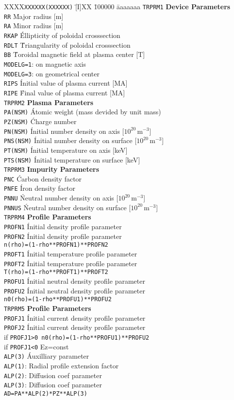 \documentclass[11pt]{jarticle}
\def\r#1{\mathrm{#1}}
\def\unit#1{\,\r{#1}}
\renewcommand{\title}[1]{\begin{center}\fboxsep=3mm\fbox{\textbf{#1}}\end{center}}
\newcommand{\inputParmLine}
{XXXX\= \texttt{XXXXXX(XXXXXX)} \= [I]XX \= 100000 \= aaaaaaa\kill}
\newcommand{\inputParmBlock}[2]
{\texttt{#1} \> \> \> \textbf{#2} \\}
\newcommand{\inputParm}[4]
{\> \texttt{#1} \> [#2] \> \> #3 \' #4 \\}
\newcommand{\inputComment}[1]
{\> \> \> \> \quad #1 \\}
\begin{document}
\title{Input Parameters}
\begin{tabbing}
\inputParmLine
\inputParmBlock{TRPRM1}{Device Parameters}
\inputParm{RR}{D}{3}{Major radius [m]}
\inputParm{RA}{D}{}{Minor radius [m]}
\inputParm{RKAP}{D}{}{Ellipticity of poloidal crosssection}
\inputParm{RDLT}{D}{}{Triangularity of poloidal crosssection}
\inputParm{BB}{D}{}{Toroidal magnetic field at plasma center [T]}
\inputComment{\texttt{MODELG=1}: on magnetic axis}
\inputComment{\texttt{MODELG=3}: on geometrical center}
\inputParm{RIPS}{D}{}{Initial value of plasma current [MA]}
\inputParm{RIPE}{D}{}{Final value of plasma current [MA]}

\inputParmBlock{TRPRM2}{Plasma Parameters}
\inputParm{PA(NSM)}{D}{}{Atomic weight (mass devided by unit mass) }
\inputParm{PZ(NSM)}{D}{}{Charge number}
\inputParm{PN(NSM)}{D}{}{Initial number density on axis [$10^{20}\unit{m^{-3}}$]}
\inputParm{PNS(NSM)}{D}{}{Initial number density on surface [$10^{20}\unit{m^{-3}}$]}
\inputParm{PT(NSM)}{D}{}{Initial temperature on axis [keV]}
\inputParm{PTS(NSM)}{D}{}{Initial temperature on surface [keV]}

\inputParmBlock{TRPRM3}{Impurity Parameters}
\inputParm{PNC}{D}{}{Carbon density factor}
\inputParm{PNFE}{D}{}{Iron density factor}
\inputParm{PNNU}{D}{}{Neutral number density on axis [$10^{20}\unit{m^{-3}}$]}
\inputParm{PNNUS}{D}{}{Neutral number density on surface [$10^{20}\unit{m^{-3}}$]}

\inputParmBlock{TRPRM4}{Profile Parameters}
\inputParm{PROFN1}{D}{}{Initial density profile parameter}
\inputParm{PROFN2}{D}{}{Initial density profile parameter}
\inputComment{\texttt{n(rho)=(1-rho**PROFN1)**PROFN2}}
\inputParm{PROFT1}{D}{}{Initial temperature profile parameter}
\inputParm{PROFT2}{D}{}{Initial temperature profile parameter}
\inputComment{\texttt{T(rho)=(1-rho**PROFT1)**PROFT2}}
\inputParm{PROFU1}{D}{}{Initial neutral density profile parameter}
\inputParm{PROFU2}{D}{}{Initial neutral density profile parameter}
\inputComment{\texttt{n0(rho)=(1-rho**PROFU1)**PROFU2}}

\inputParmBlock{TRPRM5}{Profile Parameters}
\inputParm{PROFJ1}{D}{}{Initial current density profile parameter}
\inputParm{PROFJ2}{D}{}{Initial current density profile parameter}
\inputComment{if \texttt{PROFJ1>0  n0(rho)=(1-rho**PROFU1)**PROFU2}}
\inputComment{if \texttt{PROFJ1<0} Ez=const}
\inputParm{ALP(3)}{D}{}{Auxilliary parameter}
\inputComment{\texttt{ALP(1)}: Radial profile extension factor}
\inputComment{\texttt{ALP(2)}: Diffusion coef parameter}
\inputComment{\texttt{ALP(3)}: Diffusion coef parameter}
\inputComment{\texttt{AD=PA**ALP(2)*PZ**ALP(3)}}


\end{tabbing}
\end{document}
